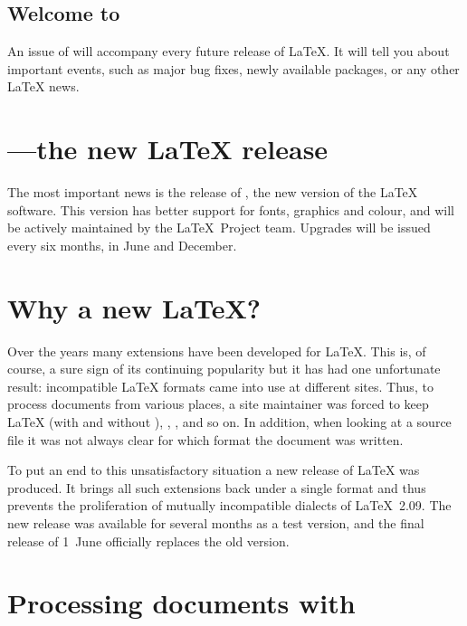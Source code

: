 \documentclass{ltnews}
\begin{document}
\maketitle

\subsection{Welcome to \LaTeXNews}

An issue of \emph{\LaTeXNews} will accompany every future release of
\LaTeX.  It will tell you about important events, such as major bug
fixes, newly available packages, or any other \LaTeX{} news.

\section{\LaTeXe---the new \LaTeX{} release}

The most important news is the release of \LaTeXe, the new version of
the \LaTeX{} software.  This version has better support for fonts,
graphics and colour, and will be actively maintained by the \LaTeX\
Project team.  Upgrades will be issued every six months, in June and
December.

\section{Why a new \LaTeX?}

Over the years many extensions have been developed for \LaTeX. This
is, of course, a sure sign of its continuing popularity but it has had
one unfortunate result: incompatible \LaTeX{} formats came into use at
different sites. Thus, to process documents from various places, a
site maintainer was forced to keep \LaTeX{} (with and without \NFSS),
\SLiTeX, \AmSLaTeX, and so on.  In addition, when looking at a source
file it was not always clear for which format the document was written.

To put an end to this unsatisfactory
situation a new release of \LaTeX{} was produced.
It brings all such extensions back under a single format and thus
prevents the proliferation of mutually incompatible dialects of
\LaTeX~2.09. The new release was available for several months as a
test version, and the final release of 1~June officially
replaces the old version.

\section{Processing documents with \LaTeXe}
\end{document}
